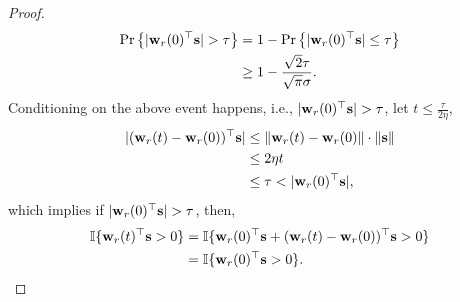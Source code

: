 \begin{proof}
\begin{equation*}
\begin{split}
	\operatorname*{Pr}\left\{ | {\mathbf{w}}_r(0)^\top {\mathbf{s}} | > \tau\right\} &= 1 - \operatorname*{Pr}\left\{ | {\mathbf{w}}_r(0)^\top {\mathbf{s}} | \le \tau\right\} \\
	&\ge 1 - \frac{\sqrt{2}\tau}{\sqrt{\pi}\sigma}.
\end{split}
\end{equation*}
Conditioning on the above event happens, i.e., $| {\mathbf{w}}_r(0)^\top {\mathbf{s}} | > \tau$, let $t \le \frac{\tau}{ 2 \eta }$,
\begin{equation*}
\begin{split}
	| ( {\mathbf{w}}_r(t) - {\mathbf{w}}_r(0) )^\top {\mathbf{s}} | &\le \| {\mathbf{w}}_r(t) - {\mathbf{w}}_r(0) \| \cdot \| {\mathbf{s}} \| \\
	&\le 2 \eta t \\
	&\le \tau < | {\mathbf{w}}_r(0)^\top {\mathbf{s}} |,
\end{split}
\end{equation*}
which implies if $| {\mathbf{w}}_r(0)^\top {\mathbf{s}} | > \tau$, then,
\begin{equation*}
\begin{split}
	{\mathbb{I}}\{ {\mathbf{w}}_r(t)^\top {\mathbf{s}} > 0 \} &= {\mathbb{I}}\{ {\mathbf{w}}_r(0)^\top {\mathbf{s}}  + ( {\mathbf{w}}_r(t) - {\mathbf{w}}_r(0) )^\top {\mathbf{s}} > 0 \} \\
	&= {\mathbb{I}}\{ {\mathbf{w}}_r(0)^\top {\mathbf{s}} > 0 \}. \qedhere
\end{split}
\end{equation*}
\end{proof}

